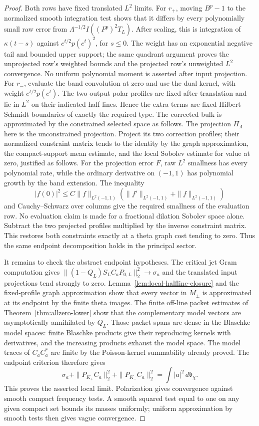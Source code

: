\begin{proof}
Both rows have fixed translated $L^2$ limits.
For $r_+$, moving $B^p-1$ to the normalized smooth integration
test shows that it differs by every polynomially small raw error
from $\Lambda^{-1/2}I((P^p)^2T_L)$.
After scaling, this is integration of $\kappa(t-s)$ against
$e^{t/2}p(e^t)^2$, for $s\leq0$.
The weight has an exponential negative tail and bounded upper
support; the same quadrant argument proves the unprojected row's
weighted bounds and the projected row's unweighted $L^2$ convergence.
No uniform polynomial moment is asserted after input projection.
For $r_-$, evaluate the band convolution at
zero and use the dual kernel, with weight $e^{t/2}p(e^t)$.
The two output polar profiles are fixed after translation and lie
in $L^2$ on their indicated half-lines.  Hence the extra terms are
fixed Hilbert--Schmidt boundaries of exactly the required type.
The corrected bulk is approximated by the constrained selected
space as follows. The projection $\Pi_\Lambda$ here is the
unconstrained projection. Project its two correction profiles; their
normalized constraint matrix tends to the identity by the graph
approximation, the compact-support mean estimate, and the local
Sobolev estimate for value at zero, justified as follows. For the
projection error $F$, raw $L^2$ smallness has every polynomial
rate, while the ordinary derivative on $(-1,1)$ has polynomial
growth by the band extension. The inequality
\[
 |f(0)|^2\leq C\|f\|_{L^2(-1,1)}
 (\|f'\|_{L^2(-1,1)}+\|f\|_{L^2(-1,1)})
\]
and Cauchy--Schwarz over columns give the required smallness
of the evaluation row. No evaluation claim is made for a
fractional dilation Sobolev space alone. Subtract the two projected
profiles multiplied by the inverse constraint matrix.  This restores
both constraints exactly at a theta graph cost tending to zero.
Thus the same endpoint decomposition holds in the principal sector.

It remains to check the abstract endpoint hypotheses.
The critical jet Gram computation gives
$\|(1-Q_L)S_LC_aP_{0,L}\|_2^2\to\sigma_a$ and the translated
input projections tend strongly to zero.
Lemma~\ref{lem:local-halfline-closure} and the fixed-profile graph
approximation show that every vector in $M_\pm$ is approximated at
its endpoint by the finite theta images.
The finite off-line packet estimates of
Theorem~\ref{thm:allzero-lower} show that the complementary model
vectors are asymptotically annihilated by $Q_L$.
Those packet spans are dense in the Blaschke model spaces: finite
Blaschke products give their reproducing kernels with derivatives,
and the increasing products exhaust the model space.
The model traces of $C_aC_a^*$ are finite by the Poisson-kernel
summability already proved.  The endpoint criterion therefore gives
\[
 \sigma_a+\|P_{K_+}C_a\|_2^2+\|P_{K_-}C_a\|_2^2
                 =\int|a|^2\,d\mathfrak b_\chi.
\]
This proves the asserted local limit.  Polarization gives convergence
against smooth compact frequency tests.  A smooth squared test equal
to one on any given compact set bounds its masses uniformly; uniform
approximation by smooth tests then gives vague convergence.
\end{proof}

